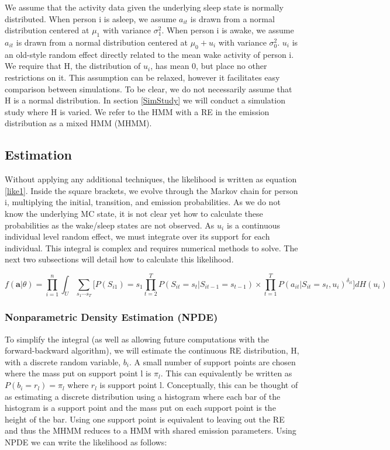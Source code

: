 \documentclass{article}
\begin{document}
We assume that the activity data given the underlying sleep state is normally distributed. When person i is asleep, we assume $a_{it}$ is drawn from a normal distribution centered at $\mu_1$ with variance $\sigma_1^2$. When person i is awake, we assume $a_{it}$ is drawn from a normal distribution centered at $\mu_0+u_i$ with variance $\sigma_0^2$. $u_i$ is an old-style random effect directly related to the mean wake activity of person i. We require that H, the distribution of $u_i$, has mean 0, but place no other restrictions on it. This assumption can be relaxed, however it facilitates easy comparison between simulations. To be clear, we do not necessarily assume that H is a normal distribution. In section \ref{SimStudy} we will conduct a simulation study where H is varied. We refer to the HMM with a RE in the emission distribution as a mixed HMM (MHMM).


\subsection{Estimation}

Without applying any additional techniques, the likelihood is written as equation \ref{like1}. Inside the square brackets, we evolve through the Markov chain for person i, multiplying the initial, transition, and emission probabilities. As we do not know the underlying MC state, it is not clear yet how to calculate these probabilities as the wake/sleep states are not observed. As $u_i$ is a continuous individual level random effect, we must integrate over its support for each individual. This integral is complex and requires numerical methods to solve. The next two subsections will detail how to calculate this likelihood. 

\begin{equation}\label{like1}
f(\textbf{a}|\theta) = \prod_{i=1}^n \int_U \sum_{{s_1}\cdots{s_T}} \biggr[ 
    P(S_{i1})=s_1\prod_{t=2}^T P(S_{it}=s_t|S_{it-1}=s_{t-1}) \times 
    \prod_{t=1}^T P(a_{it}|S_{it}=s_t,u_i)^{\delta_{it}} \biggr] dH(u_i)
\end{equation}

\subsubsection{Nonparametric Density Estimation (NPDE)}

To simplify the integral (as well as allowing future computations with the forward-backward algorithm), we will estimate the continuous RE distribution, H, with a discrete random variable, $b_i$. A small number of support points are chosen where the mass put on support point l is $\pi_l$. This can equivalently be written as $P(b_i = r_l) = \pi_l$ where $r_l$ is support point l. Conceptually, this can be thought of as estimating a discrete distribution using a histogram where each bar of the histogram is a support point and the mass put on each support point is the height of the bar. Using one support point is equivalent to leaving out the RE and thus the MHMM reduces to a HMM with shared emission parameters. Using NPDE we can write the likelihood as follows: 
\end{document}

